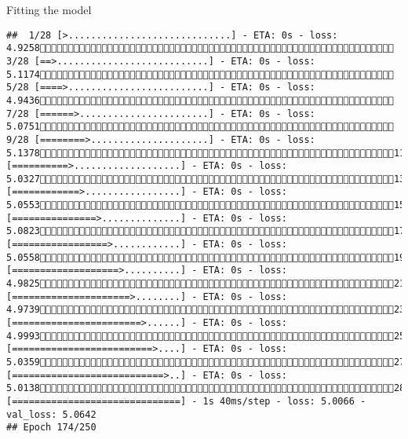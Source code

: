 \documentclass[
  ignorenonframetext,
]{beamer}
\begin{document}
\begin{frame}[fragile]{Fitting the model}
\begin{verbatim}
##  1/28 [>.............................] - ETA: 0s - loss: 4.9258 3/28 [==>...........................] - ETA: 0s - loss: 5.1174 5/28 [====>.........................] - ETA: 0s - loss: 4.9436 7/28 [======>.......................] - ETA: 0s - loss: 5.0751 9/28 [========>.....................] - ETA: 0s - loss: 5.137811/28 [==========>...................] - ETA: 0s - loss: 5.032713/28 [============>.................] - ETA: 0s - loss: 5.055315/28 [===============>..............] - ETA: 0s - loss: 5.082317/28 [=================>............] - ETA: 0s - loss: 5.055819/28 [===================>..........] - ETA: 0s - loss: 4.982521/28 [=====================>........] - ETA: 0s - loss: 4.973923/28 [=======================>......] - ETA: 0s - loss: 4.999325/28 [=========================>....] - ETA: 0s - loss: 5.035927/28 [===========================>..] - ETA: 0s - loss: 5.013828/28 [==============================] - 1s 40ms/step - loss: 5.0066 - val_loss: 5.0642
## Epoch 174/250

\end{verbatim}
\end{frame}
\end{document}
